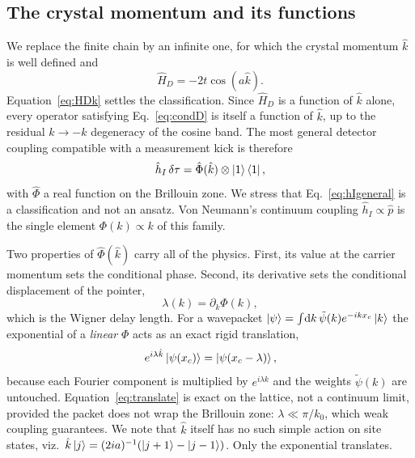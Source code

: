 \documentclass[10pt,
 amsmath,amssymb,
 aps,prb, twocolumn
]{revtex4-2}
\begin{document}
\subsection{The crystal momentum and its functions}
\label{app:vn:K}

We replace the finite chain by an infinite one, for which the crystal
momentum $\hat k$ is well defined and
\begin{equation}
\hat H_D=-2t\cos(a\hat k).
\label{eq:HDk}
\end{equation}
Equation~\eqref{eq:HDk} settles the classification. Since $\hat H_D$ is a
function of $\hat k$ alone, every operator satisfying Eq.~\eqref{eq:condD}
is itself a function of $\hat k$, up to the residual $k\to-k$ degeneracy of
the cosine band. The most general detector coupling compatible with a
measurement kick is therefore
\begin{equation}
\hat h_I\,\delta\tau=\hat\Phi(\hat k)\otimes\ket{1}\bra{1},
\label{eq:hIgeneral}
\end{equation}
with $\hat\Phi$ a real function on the Brillouin zone. We stress that
Eq.~\eqref{eq:hIgeneral} is a classification and not an ansatz. Von
Neumann's continuum coupling $\hat h_I\propto\hat p$ is the single element
$\Phi(k)\propto k$ of this family.

Two properties of $\hat\Phi(\hat k)$ carry all of the physics. First, its
value at the carrier momentum sets the conditional phase. Second, its
derivative sets the conditional displacement of the pointer,
\begin{equation}
\lambda(k)=\partial_k\Phi(k),
\label{eq:lambda}
\end{equation}
which is the Wigner delay length. For a wavepacket
$\ket{\psi}=\int\!\mathrm{d}k\,\tilde\psi(k)e^{-ikx_c}\ket{k}$ the
exponential of a \emph{linear} $\Phi$ acts as an exact rigid translation,
\begin{equation}
e^{i\lambda\hat k}\ket{\psi(x_c)}=\ket{\psi(x_c-\lambda)},
\label{eq:translate}
\end{equation}
because each Fourier component is multiplied by $e^{i\lambda k}$ and the
weights $\tilde\psi(k)$ are untouched. Equation~\eqref{eq:translate} is
exact on the lattice, not a continuum limit, provided the packet does not
wrap the Brillouin zone: $\lambda\ll\pi/k_0$, which weak coupling
guarantees. We note that $\hat k$ itself has no such simple action on site
states, viz.\ $\hat k\ket{j}=(2ia)^{-1}(\ket{j+1}-\ket{j-1})$. Only the
exponential translates.
\end{document}
